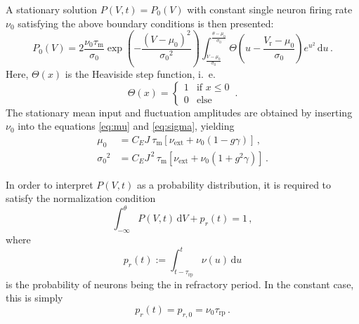 A stationary solution $P(V, t) = P_0(V)$ with constant 
single neuron firing rate $\nu_0$ 
satisfying the above boundary conditions is then presented:
\begin{equation}
    P_0(V) = 2 \frac{\nu_0 \tau_\text{m}}{\sigma_0} 
        \exp{\left(- \frac{(V - \mu_0)^2}{{\sigma_0}^2} \right)}
        \int_{\frac{V - \mu_0}{\sigma_0}}^{\frac{\theta - \mu_0}{\sigma_0}} \! 
            \Theta \left(u - \frac{V_\text{r} - \mu_0}{\sigma_0} \right) e^{u^2} \, \text{d}u  \,. 
    \label{eq:P_V_0}
\end{equation}
Here, $\Theta(x)$ is the Heaviside step function, i.~e. 
\begin{equation}
    \Theta(x) = \begin{cases} 1 & \text{if } x \le 0 \\ 0 & \text{else } \end{cases}  \,.
    \label{eq:heaviside}
\end{equation}
The stationary mean input and fluctuation amplitudes are obtained by inserting 
$\nu_0$ into the equations \eqref{eq:mu} and \eqref{eq:sigma}, yielding 
\begin{align}
    \mu_0 	    &= C_E J \:\tau_\text{m} [\nu_\text{ext} + \nu_0(1 - g \gamma)]  \,, \\ 
    {\sigma_0}^2 	&= C_E J^{\,2} \,\tau_\text{m} [\nu_\text{ext} + \nu_0(1 + g^2 \gamma)] \,.
    \label{eq:mu_sigma_0}
\end{align}

In order to interpret $P(V, t)$ as a probability distribution, it is required to
satisfy the normalization condition
\begin{equation}
    \int_{-\infty}^{\theta} \! P(V, t) \, \text{d}V  + p_r(t) = 1 \, ,
    \label{eq:P_V_prob}
\end{equation}
where 
\begin{equation}
    p_r(t) := \int_{t - \tau_\text{rp}}^{t} \! \nu(u) \, \text{d}u 
    \label{eq:p_r}
\end{equation}
is the probability of neurons being the in refractory period.
In the constant case, this is simply 
\begin{equation}
    p_r(t) = p_{r, 0} = \nu_0 \tau_\text{rp}  \,.
    \label{eq:p_r_0}
\end{equation}

